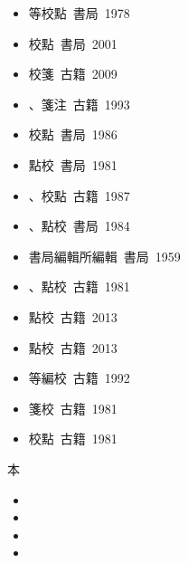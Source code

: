 \begin{enumerate}
\begin{itemize}
        \item {}等校點\ {\small {}書局\ 1978}
        \item {}校點\ {\small {}書局\ 2001}
        \item {}校箋\ {\small {}古籍\ 2009}
        \item {}、箋注\ {\small {}古籍\ 1993}
        \item {}校點\ {\small {}書局\ 1986}
        \item {}點校\ {\small {}書局\ 1981}
        \item {}、校點\ {\small {}古籍\ 1987}
        \item {}、點校\ {\small {}書局\ 1984}
        \item {}書局編輯所編輯\ {\small {}書局\ 1959}
        \item {}、點校\ {\small {}古籍\ 1981}
        \item {}點校\ {\small {}古籍\ 2013}
        \item {}點校\ {\small {}古籍\ 2013}
        \item {}等編校\ {\small {}古籍\ 1992}
        \item {}箋校\ {\small {}古籍\ 1981}
        \item {}校點\ {\small {}古籍\ 1981}
    \end{itemize}
    本
    \begin{itemize}
        \item {}
        \item {}
        \item {}
        \item {}

\end{itemize}
\end{enumerate}
